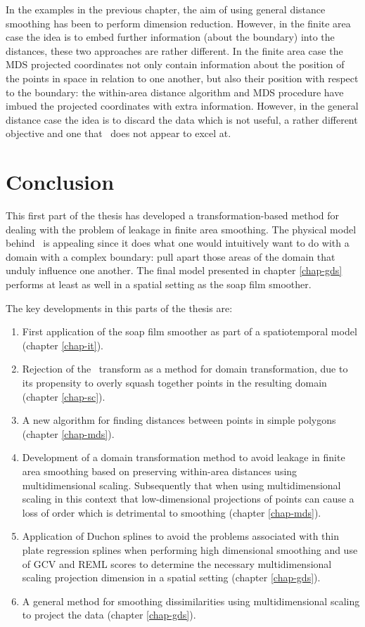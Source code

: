 In the examples in the previous chapter, the aim of using general distance smoothing has been to perform dimension reduction. However, in the finite area case the idea is to embed further information (about the boundary) into the distances, these two approaches are rather different. In the finite area case the MDS projected coordinates not only contain information about the position of the points in space in relation to one another, but also their position with respect to the boundary: the within-area distance algorithm and MDS procedure have imbued the projected coordinates with extra information. However, in the general distance case the idea is to discard the data which is not useful, a rather different objective and one that \mdsds\ does not appear to excel at.

\section{Conclusion}

This first part of the thesis has developed a transformation-based method for dealing with the problem of leakage in finite area smoothing. The physical model behind \mdsds\ is appealing since it does what one would intuitively want to do with a domain with a complex boundary: pull apart those areas of the domain that unduly influence one another. The final model presented in chapter \ref{chap-gds} performs at least as well in a spatial setting as the soap film smoother.

The key developments in this parts of the thesis are:
\begin{enumerate}
\item First application of the soap film smoother as part of a spatiotemporal model (chapter \ref{chap-it}).
\item Rejection of the \sch\ transform as a method for domain transformation, due to its propensity to overly squash together points in the resulting domain (chapter \ref{chap-sc}).
\item A new algorithm for finding distances between points in simple polygons (chapter \ref{chap-mds}).
\item Development of a domain transformation method to avoid leakage in finite area smoothing based on preserving within-area distances using multidimensional scaling. Subsequently that when using multidimensional scaling in this context that low-dimensional projections of points can cause a loss of order which is detrimental to smoothing (chapter \ref{chap-mds}).
\item Application of Duchon splines to avoid the problems associated with thin plate regression splines when performing high dimensional smoothing and use of GCV and REML scores to determine the necessary multidimensional scaling projection dimension in a spatial setting (chapter \ref{chap-gds}).
\item A general method for smoothing dissimilarities using multidimensional scaling to project the data (chapter \ref{chap-gds}).
\end{enumerate}

